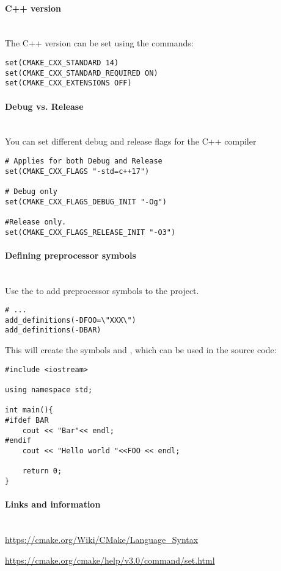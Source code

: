 \documentclass[11pt,letter,landscape]{scrartcl} %
\newcommand{\sectiontitle}[1]{\paragraph{#1} \ \\} %
\begin{document}
\begin{multicols}{2}
\sectiontitle{C++ version}

The C++ version can be set using the commands:

\begin{verbatim}
set(CMAKE_CXX_STANDARD 14)
set(CMAKE_CXX_STANDARD_REQUIRED ON)
set(CMAKE_CXX_EXTENSIONS OFF)
\end{verbatim}
\sectiontitle{Debug vs. Release}

You can set different debug and release flags for the C++ compiler

\begin{verbatim}
# Applies for both Debug and Release
set(CMAKE_CXX_FLAGS "-std=c++17")

# Debug only
set(CMAKE_CXX_FLAGS_DEBUG_INIT "-Og")

#Release only.
set(CMAKE_CXX_FLAGS_RELEASE_INIT "-O3")
\end{verbatim}
\sectiontitle{Defining preprocessor symbols}

Use the  to add preprocessor symbols to the project.

\begin{verbatim}
# ...
add_definitions(-DFOO=\"XXX\")
add_definitions(-DBAR)
\end{verbatim}

This will create the symbols  and , which can be used in the source code:

\begin{verbatim}
#include <iostream>

using namespace std;

int main(){
#ifdef BAR
    cout << "Bar"<< endl;
#endif
    cout << "Hello world "<<FOO << endl;

    return 0;
}
\end{verbatim}

\vspace{\baselineskip} %


\sectiontitle{Links and information}

\url{https://cmake.org/Wiki/CMake/Language_Syntax}

\url{https://cmake.org/cmake/help/v3.0/command/set.html}



\end{multicols}
\end{document}

